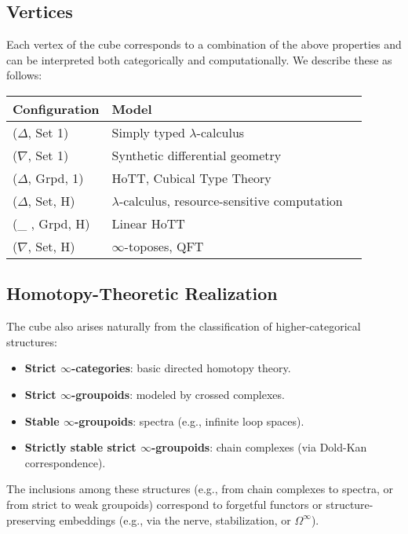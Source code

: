 \documentclass{article}
\begin{document}
\subsection{Vertices}

Each vertex of the cube corresponds to a combination of the above properties and can be interpreted both categorically and computationally. We describe these as follows:

\begin{center}
\begin{tabular}{|l|l|l|}
\hline
\textbf{Configuration} & \textbf{Model} \\
\hline
($\Delta$, Set   1) & Simply typed $\lambda$-calculus \\
($\nabla$, Set   1) & Synthetic differential geometry \\
($\Delta$, Grpd, 1) & HoTT, Cubical Type Theory \\
($\Delta$, Set,  H) & $\lambda$-calculus, resource-sensitive computation \\
(\_      , Grpd, H) & Linear HoTT \\
($\nabla$, Set,  H) & $\infty$-toposes, QFT \\
\hline
\end{tabular}
\end{center}

\subsection{Homotopy-Theoretic Realization}

The cube also arises naturally from the classification of higher-categorical structures:

\begin{itemize}
\item \textbf{Strict $\infty$-categories}: basic directed homotopy theory.
\item \textbf{Strict $\infty$-groupoids}: modeled by crossed complexes.
\item \textbf{Stable $\infty$-groupoids}: spectra (e.g., infinite loop spaces).
\item \textbf{Strictly stable strict $\infty$-groupoids}: chain complexes (via Dold-Kan correspondence).
\end{itemize}

The inclusions among these structures (e.g., from chain
complexes to spectra, or from strict to weak groupoids)
correspond to forgetful functors or structure-preserving
embeddings (e.g., via the nerve, stabilization, or $\Omega^\infty$).
\end{document}
